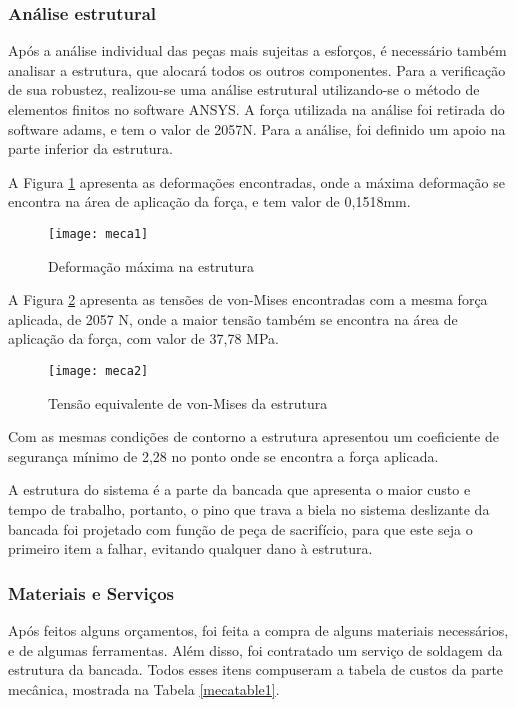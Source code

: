 \subsubsection{Análise estrutural}


	Após a análise individual das peças mais sujeitas a esforços, é necessário também analisar a estrutura, que alocará todos os outros componentes. Para a verificação de sua robustez, realizou-se uma análise estrutural utilizando-se o método de elementos finitos no software ANSYS. A força utilizada na análise foi retirada do software adams, e tem o valor de 2057N. Para a análise, foi definido um apoio na parte inferior da estrutura.
 	
 	A Figura \ref{meca1} apresenta as deformações encontradas, onde a máxima deformação se encontra na área de aplicação da força, e tem valor de 0,1518mm.

	\begin{figure}[!htpb]
		\centering
		\texttt{[image: meca1]}
		\caption{Deformação máxima na estrutura}
		\label{meca1}
	\end{figure}

	A Figura \ref{meca2} apresenta as tensões de von-Mises encontradas com a mesma força aplicada, de 2057 N, onde a maior tensão também se encontra na área de aplicação da força, com valor de 37,78 MPa.

	\newpage
	\begin{figure}[!htpb]
		\centering
		\texttt{[image: meca2]}
		\caption{Tensão equivalente de von-Mises da estrutura}
		\label{meca2}
	\end{figure}

	Com as mesmas condições de contorno a estrutura apresentou um coeficiente de segurança mínimo de 2,28 no ponto onde se encontra a força aplicada. 
	
	A estrutura do sistema é a parte da bancada que apresenta o maior custo e tempo de trabalho, portanto, o pino que trava a biela no sistema deslizante da bancada foi projetado com função de peça de sacrifício, para que este seja o primeiro item a falhar, evitando qualquer dano à estrutura.


\subsubsection{Materiais e Serviços}

	Após feitos alguns orçamentos, foi feita a compra de alguns materiais necessários, e de algumas ferramentas. Além disso, foi contratado um serviço de soldagem da estrutura da bancada. Todos esses itens compuseram a tabela de custos da parte mecânica, mostrada na Tabela \ref{mecatable1}.

